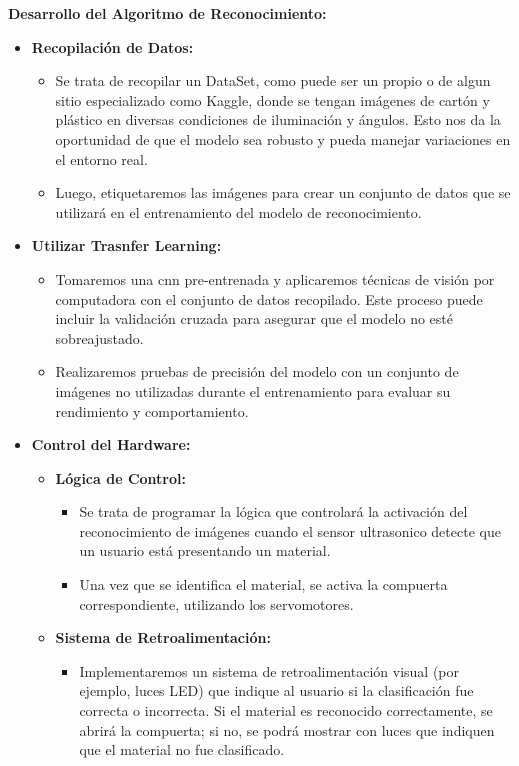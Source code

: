 \textbf{Desarrollo del Algoritmo de Reconocimiento:}
\begin{itemize}
    \item \textbf{Recopilación de Datos:}
    \begin{itemize}
        \item Se trata de recopilar un DataSet, como puede ser un propio o de algun sitio especializado como Kaggle, donde se tengan imágenes de cartón  y plástico en diversas condiciones de iluminación y ángulos. Esto nos da la oportunidad de que el modelo sea robusto y pueda manejar variaciones en el entorno real.
        \item Luego, etiquetaremos las imágenes para crear un conjunto de datos que se utilizará en el entrenamiento del modelo de reconocimiento.
    \end{itemize}
    
    \item \textbf{Utilizar Trasnfer Learning:}
    \begin{itemize}
        \item Tomaremos una cnn pre-entrenada y aplicaremos técnicas de visión por computadora con el conjunto de datos recopilado. Este proceso puede incluir la validación cruzada para asegurar que el modelo no esté sobreajustado.
        \item Realizaremos pruebas de precisión del modelo con un conjunto de imágenes no utilizadas durante el entrenamiento para evaluar su rendimiento y comportamiento.
    \end{itemize}
    
    \item \textbf{Control del Hardware:}
    \begin{itemize}
        \item \textbf{Lógica de Control:}
        \begin{itemize}
            \item Se trata de programar la lógica que controlará la activación del reconocimiento de imágenes cuando el sensor ultrasonico detecte que un usuario está presentando un material.
            \item Una vez que se identifica el material, se activa la compuerta correspondiente, utilizando los servomotores.
        \end{itemize}
        
        \item \textbf{Sistema de Retroalimentación:}
        \begin{itemize}
            \item Implementaremos un sistema de retroalimentación visual (por ejemplo, luces LED) que indique al usuario si la clasificación fue correcta o incorrecta. Si el material es reconocido correctamente, se abrirá la compuerta; si no, se podrá mostrar con luces que indiquen que el material no fue clasificado.
        \end{itemize}
    \end{itemize}
\end{itemize}


